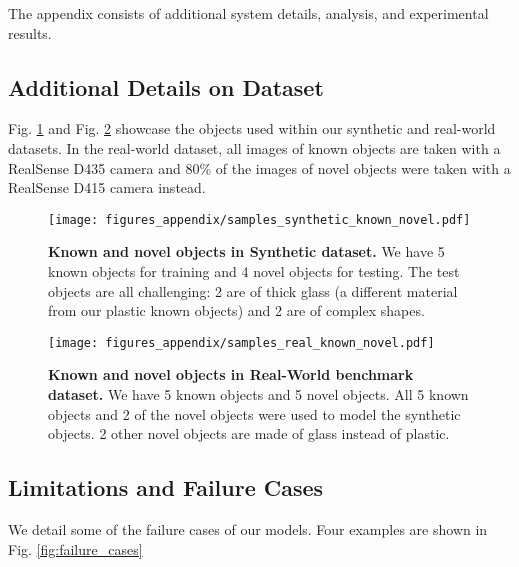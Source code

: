\documentclass[letterpaper, 10 pt, conference]{ieeeconf}
\begin{document}
The appendix consists of additional system details, analysis, and experimental results.

\subsection{Additional Details on Dataset}
Fig. \ref{fig:samples_datasets_syn} and Fig. \ref{fig:samples_datasets_real} showcase the objects used within our synthetic and real-world datasets. In the real-world dataset, all images of known objects are taken with a RealSense D435 camera and 80\% of the images of novel objects were taken with a RealSense D415 camera instead.

\begin{figure}[ht]
    \centering
    \texttt{[image: figures\_appendix/samples\_synthetic\_known\_novel.pdf]}
    \caption{\textbf{Known and novel objects in Synthetic dataset.} We have 5 known objects for training and 4 novel objects for testing. The test objects are all challenging: 2 are of thick glass (a different material from our plastic known objects) and 2 are of complex shapes.}
    \label{fig:samples_datasets_syn}
    \vspace{-2mm}
\end{figure}

\begin{figure}[ht]
\vspace{-1mm}
    \centering
    \texttt{[image: figures\_appendix/samples\_real\_known\_novel.pdf]}
    \caption{\textbf{Known and novel objects in Real-World benchmark dataset.} We have 5 known objects and 5 novel objects. All 5 known objects and 2 of the novel objects were used to model the synthetic objects. 2 other novel objects are made of glass instead of plastic.}
    \label{fig:samples_datasets_real}
    \vspace{-2mm}
\end{figure}


\subsection{Limitations and Failure Cases}
We detail some of the failure cases of our models. Four examples are shown in Fig. \ref{fig:failure_cases}
\end{document}
